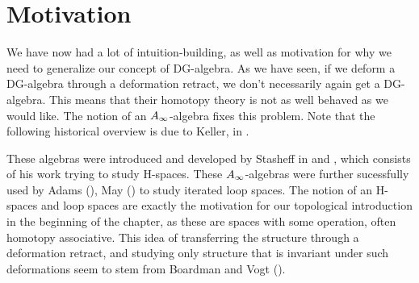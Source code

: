 






\section{Motivation}

We have now had a lot of intuition-building, as well as motivation for why we need to generalize our concept of DG-algebra. As we have seen, if we deform a DG-algebra through a deformation retract, we don't necessarily again get a DG-algebra. This means that their homotopy theory is not as well behaved as we would like. The notion of an $A_{\infty}$-algebra fixes this problem. Note that the following historical overview is due to Keller, in \cite{keller}.

These algebras were introduced and developed by Stasheff in \cite{h-spaces1} and \cite{h-spaces2}, which consists of his work trying to study H-spaces. These $A_{\infty}$-algebras were further sucessfully used by Adams (\cite{adams_loop}), May (\cite{may_loop}) to study iterated loop spaces. The notion of an H-spaces and loop spaces are exactly the motivation for our topological introduction in the beginning of the chapter, as these are spaces with some operation, often homotopy associative. This idea of transferring the structure through a deformation retract, and studying only structure that is invariant under such deformations seem to stem from Boardman and Vogt (\cite{boardman_vogt}). 

